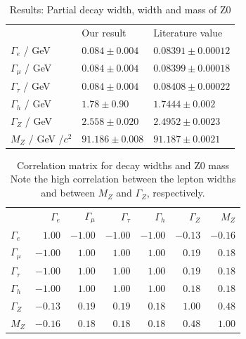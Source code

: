 \begin{table}[htpb]
    \centering
\caption{Results: Partial decay width, width and mass of Z0}
\label{tab:results}
    \begin{tabular}{l l l}
 \rowcolor{LightCyan} & Our result & Literature value \\
 \cellcolor{LightCyan}$\Gamma_e$ / GeV &   $ 0.084\pm0.004   $ & $0.08391 \pm 0.00012 $\\
 \cellcolor{LightCyan}$\Gamma_\mu$ / GeV&   $ 0.084\pm0.004 $ & $0.08399 \pm 0.00018 $\\
 \cellcolor{LightCyan}$\Gamma_\tau$ / GeV&   $ 0.084\pm0.004   $ & $0.08408 \pm 0.00022 $\\
 \cellcolor{LightCyan}$\Gamma_h$ / GeV&   $ 1.78\pm0.90     $ & $1.7444\pm0.002      $\\
 \cellcolor{LightCyan}$\Gamma_Z$ / GeV&   $ 2.558\pm0.020   $ & $2.4952\pm0.0023     $\\
 \cellcolor{LightCyan}$M_Z    $ / GeV /$c^2$&   $ 91.186\pm0.008  $ & $91.187\pm0.0021     $\\
    \end{tabular}
\end{table}

\begin{table}[htpb]
    \centering
    \caption{Correlation matrix for decay widths and Z0 mass 
        Note the high correlation between the lepton widths and between $M_Z$ and $\Gamma_Z$, respectively.}
    \label{tab:covmat}
\begin{tabular}{l| r| r| r |r | r|r}
\rowcolor{LightCyan} & $\Gamma_e$ & $\Gamma_\mu$ & $\Gamma_\tau$ & $\Gamma_h$ &$\Gamma_Z$ & $M_Z$ \\ 
\cellcolor{LightCyan} $\Gamma_e$ & $1.00$ & $-1.00$ & $-1.00$ & $-1.00$ & $-0.13$ & $-0.16$ \\ 
\cellcolor{LightCyan} $\Gamma_\mu$ & $-1.00$ & $1.00$ & $1.00$ & $1.00$ & $0.19$ & $0.18$ \\ 
\cellcolor{LightCyan} $\Gamma_\tau$ & $-1.00$ & $1.00$ & $1.00$ & $1.00$ & $0.19$ & $0.18$ \\ 
\cellcolor{LightCyan} $\Gamma_h$ & $-1.00$ & $1.00$ & $1.00$ & $1.00$ & $0.18$ & $0.18$ \\ 
\cellcolor{LightCyan} $\Gamma_Z$ & $-0.13$ & $0.19$ & $0.19$ & $0.18$ & $1.00$ & $0.48$ \\ 
\cellcolor{LightCyan} $M_Z$ & $-0.16$ & $0.18$ & $0.18$ & $0.18$ & $0.48$ & $1.00$ \\ 
\end{tabular}



\end{table}
